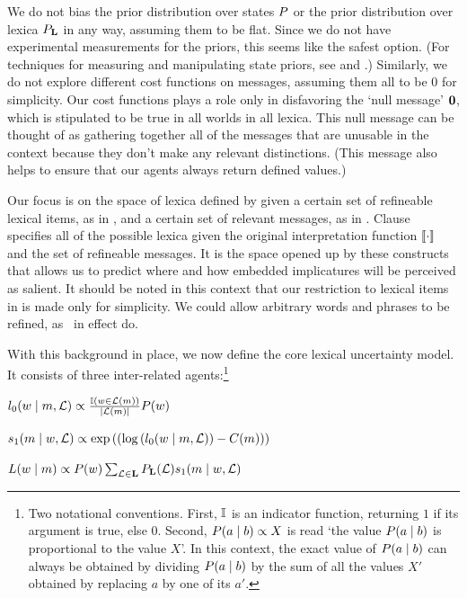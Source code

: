 \documentclass[leqno]{article}
\begin{document}
We do not bias the prior distribution over states $P$
or the prior distribution over lexica $P_{\mathbf{L}}$ in any way, assuming them to be
flat. Since we do not have experimental measurements for the priors,
this seems like the safest option. (For techniques for measuring and
manipulating state priors, see \citealt{Frank:Goodman:2012} and
\citealt{Stiller:Goodman:Frank:2011}.)  Similarly, we do not explore
different cost functions on messages, assuming them all to be $0$ for
simplicity. Our cost functions plays a role only in disfavoring the
`null message' $\mathbf{0}$, which is stipulated to be true in all
worlds in all lexica. This null message can be thought of as gathering
together all of the messages that are unusable in the context because
they don't make any relevant distinctions. (This message also helps to
ensure that our agents always return defined values.)

Our focus is on the space of lexica defined by
 given a certain set of refineable lexical
items, as in , and a certain set of
relevant messages, as in
. Clause~
specifies all of the possible lexica given the original interpretation
function $\llbracket\cdot\rrbracket$ and the set of refineable messages. It is the
space opened up by these constructs that allows us to predict where
and how embedded implicatures will be perceived as salient. It should
be noted in this context that our restriction to lexical items in
 is made only for simplicity. We could
allow arbitrary words and phrases to be refined, as \CFS\ in effect
do.

With this background in place, we now define the core lexical
uncertainty model. It consists of three inter-related
agents:\footnote{Two notational conventions. First, $\mathbb{I}$ is an
  indicator function, returning $1$ if its argument is true, else
  $0$. Second, $P(a \mid b) \propto X$ is read `the value $P(a
  \mid b)$ is proportional to the value $X$'. In this context, the
  exact value of $P(a \mid b)$ can always be obtained by dividing
  $P(a \mid b)$ by the sum of all the values $X'$ obtained by
  replacing $a$ by one of its $a'$.}
%
\begin{examples}
\item\label{agents}
  \begin{examples}
  \item\label{l0}%
    $l_{0}(w \mid m, \mathcal{L}) \propto
    \frac{\mathbb{I}(w \in \mathcal{L}(m))}{|\mathcal{L}(m)|}
    P(w)$

  \item\label{s1}%
    $s_{1}(m \mid w, \mathcal{L}) \propto
    \exp
    \left(
      \left(
        \log\left(l_{0}(w \mid m, \mathcal{L}) \right)
        - 
        C(m)
      \right)
    \right)$
    
  \item\label{L} 
    $L(w \mid m) 
    \propto 
    P(w)
    \sum_{\mathcal{L} \in \mathbf{L}}
    P_{\mathbf{L}}(\mathcal{L})
    s_{1}(m \mid w, \mathcal{L})$
  \end{examples}
\end{examples}
\end{document}
